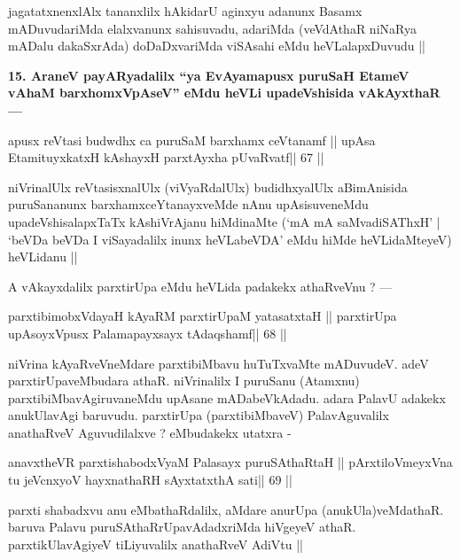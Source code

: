 \begin{artha}
jagatatxnenxlAlx tananxlilx hAkidarU aginxyu adanunx Basamx mADuvudariMda elalxvanunx sahisuvadu, adariMda (veVdAthaR niNaRya mADalu dakaSxrAda) doDaDxvariMda viSAsahi eMdu heVLalapxDuvudu ||
\end{artha}

\begin{artha}
{\bf 15. AraneV payARyadalilx ``ya EvAyamapusx puruSaH EtameV vAhaM barxhomxVpAseV'' eMdu heVLi upadeVshisida vAkAyxthaR ---}
\end{artha}

\begin{shl}
apusx reVtasi budwdhx ca puruSaM barxhamx ceVtanamf ||
upAsa EtamituyxkatxH kAshayxH parxtAyxha pUvaRvatf\hfill || 67 ||
\end{shl}

\begin{artha}
niVrinalUlx reVtasisxnalUlx (viVyaRdalUlx) budidhxyalUlx aBimAnisida 
puruSananunx barxhamxceYtanayxveMde nAnu upAsisuveneMdu 
upadeVshisalapxTaTx kAshiVrAjanu hiMdinaMte (`mA mA saMvadiSAThxH' | `beVDa beVDa I viSayadalilx inunx heVLabeVDA' eMdu hiMde heVLidaMteyeV) heVLidanu ||
\end{artha}

\begin{artha}
A vAkayxdalilx parxtirUpa eMdu heVLida padakekx athaRveVnu ? ---
\end{artha}

\begin{shl}
parxtibimobxVdayaH kAyaRM parxtirUpaM yatasatxtaH ||
parxtirUpa upAsoyxV\s pusx Palamapayxsayx tAdaqshamf\hfill || 68 ||
\end{shl}

\begin{artha}
niVrina kAyaRveVneMdare parxtibiMbavu huTuTxvaMte mADuvudeV. adeV 
parxtirUpaveMbudara athaR. niVrinalilx I puruSanu (Atamxnu) 
parxtibiMbavAgiruvaneMdu upAsane mADabeVkAdadu. adara PalavU adakekx 
anukUlavAgi baruvudu. parxtirUpa (parxtibiMbaveV) PalavAguvalilx 
anathaRveV Aguvudilalxve ? eMbudakekx utatxra - 
\end{artha}

\begin{shl}
anavxtheVR parxtishabodxV\s yaM Palasayx puruSAthaRtaH ||
pArxtiloVmeyxVna tu jeVcnxyoV hayxnathaRH sAyxtatxthA sati\hfill || 69 ||
\end{shl}

\begin{artha}
parxti shabadxvu anu eMbathaRdalilx, aMdare anurUpa (anukUla)veMdathaR. 
baruva Palavu puruSAthaRrUpavAdadxriMda hiVgeyeV athaR. parxtikUlavAgiyeV tiLiyuvalilx anathaRveV AdiVtu ||
\end{artha}

